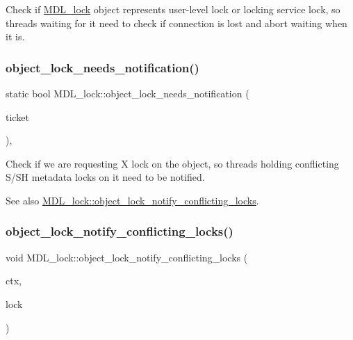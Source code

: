 Check if \mbox{\hyperlink{classMDL__lock}{M\+D\+L\+\_\+lock}} object represents user-\/level lock or locking service lock, so threads waiting for it need to check if connection is lost and abort waiting when it is. \mbox{\label{classMDL__lock_a382145d0f9b0f94a05ef03edbe922054}} 
\subsubsection{\texorpdfstring{object\+\_\+lock\+\_\+needs\+\_\+notification()}{object\_lock\_needs\_notification()}}
{\footnotesize\ttfamily static bool M\+D\+L\+\_\+lock\+::object\+\_\+lock\+\_\+needs\+\_\+notification (\begin{DoxyParamCaption}\item[{const \mbox{\hyperlink{classMDL__ticket}{M\+D\+L\+\_\+ticket}} $\ast$}]{ticket }\end{DoxyParamCaption})\hspace{0.3cm}{\ttfamily [inline]}, {\ttfamily [static]}}

Check if we are requesting X lock on the object, so threads holding conflicting S/\+SH metadata locks on it need to be notified.

\begin{DoxySeeAlso}{See also}
\mbox{\hyperlink{classMDL__lock_aa30406c0d7d46396e15c4ca66abc6fc7}{M\+D\+L\+\_\+lock\+::object\+\_\+lock\+\_\+notify\+\_\+conflicting\+\_\+locks}}. 
\end{DoxySeeAlso}
\mbox{\label{classMDL__lock_aa30406c0d7d46396e15c4ca66abc6fc7}} 
\subsubsection{\texorpdfstring{object\+\_\+lock\+\_\+notify\+\_\+conflicting\+\_\+locks()}{object\_lock\_notify\_conflicting\_locks()}}
{\footnotesize\ttfamily void M\+D\+L\+\_\+lock\+::object\+\_\+lock\+\_\+notify\+\_\+conflicting\+\_\+locks (\begin{DoxyParamCaption}\item[{\mbox{\hyperlink{classMDL__context}{M\+D\+L\+\_\+context}} $\ast$}]{ctx,  }\item[{\mbox{\hyperlink{classMDL__lock}{M\+D\+L\+\_\+lock}} $\ast$}]{lock }\end{DoxyParamCaption})\hspace{0.3cm}{\ttfamily [static]}}

